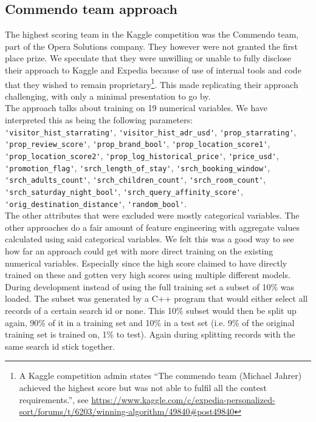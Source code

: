 \documentclass{llncs}
\begin{document}
\pagebreak
\subsection{Commendo team approach}
The highest scoring team in the Kaggle competition was the Commendo team, part of the Opera Solutions company. They however were not granted the first place prize. We speculate that they were unwilling or unable to fully disclose their approach to Kaggle and Expedia because of use of internal tools and code that they wished to remain proprietary\footnote{A Kaggle competition admin states ``The commendo team (Michael Jahrer) achieved the highest score but was not able to fulfil all the contest requirements.'', see \url{https://www.kaggle.com/c/expedia-personalized-sort/forums/t/6203/winning-algorithm/49840#post49840}}. This made replicating their approach challenging, with only a minimal presentation to go by\cite{Jahrer2013}.\\
The approach talks about training on 19 numerical variables. We have interpreted this as being the following parameters:\\
\verb!'visitor_hist_starrating'!, \verb!'visitor_hist_adr_usd'!, \verb!'prop_starrating'!, \verb!'prop_review_score'!, \verb!'prop_brand_bool'!, \verb!'prop_location_score1'!, \verb!'prop_location_score2'!, \verb!'prop_log_historical_price'!, \verb!'price_usd'!, \verb!'promotion_flag'!, \verb!'srch_length_of_stay'!, \verb!'srch_booking_window'!, \verb!'srch_adults_count'!, \verb!'srch_children_count'!, \verb!'srch_room_count'!, \verb!'srch_saturday_night_bool'!, \verb!'srch_query_affinity_score'!, \verb!'orig_destination_distance'!, \verb!'random_bool'!. \\
The other attributes that were excluded were mostly categorical variables. The other approaches do a fair amount of feature engineering with aggregate values calculated using said categorical variables. We felt this was a good way to see how far an approach could get with more direct training on the existing numerical variables. Especially since the high score claimed to have directly trained on these and gotten very high scores using multiple different models.\\
During development instead of using the full training set a subset of 10\% was loaded. The subset was generated by a C++ program that would either select all records of a certain search id or none. This 10\% subset would then be split up again, 90\% of it in a training set and 10\% in a test set (i.e. 9\% of the original training set is trained on, 1\% to test). Again during splitting records with the same search id stick together.\\
\end{document}
